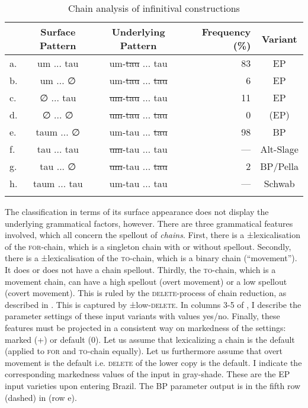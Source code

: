 \documentclass[output=paper,hidelinks,draftmode]{langscibook}
\begin{document}


\begin{table}
	\begin{tabularx}{\textwidth} {l C C r c}
		\lsptoprule
      & Surface Pattern & Underlying Pattern & {Frequency} (\%) & Variant \\\midrule
a.& um ... tau & um-\sout{tau} ... tau & 83 & EP \\
b.& um ... ∅ & um-\sout{tau} ... \sout{tau} & 6 & EP \\
c.&∅ ... tau & \sout{um}-\sout{tau} ... tau & 11 & EP \\
d.&∅ ... ∅ & \sout{um}-\sout{tau} ... \sout{tau} & 0 & (EP) \\
\midrule
e.&taum ... ∅ & um-tau ... \sout{tau} & 98 & BP \\
f.& tau ... tau & \sout{um}{}-tau ... tau & {}--- & Alt-Slage \\
g.& tau ... ∅ & \sout{um}-tau ... \sout{tau} & {}2 & BP/Pella \\
h.&taum ... tau & um-tau ... tau & {}--- & Schwab \\
		\lspbottomrule
\end{tabularx}

\caption{Chain analysis of infinitival constructions}
\label{tab:postma:5}
\end{table}


The classification in terms of its surface appearance does not display the underlying grammatical factors, however. There are three grammatical features involved, which all concern the spellout of \textit{chains}. First, there is a ±lexicalisation of the \textsc{for}-chain, which is a singleton chain with or without spellout. Secondly, there is a ±lexicalisation of the \textsc{to}-chain, which is a binary chain (``movement''). It does or does not have a chain spellout. Thirdly, the \textsc{to}-chain, which is a movement chain, can have a high spellout (overt movement) or a low spellout (covert movement). This is ruled by the \textsc{delete}{}-process of chain reduction, as described in \citet{Nunes1995}. This is captured by ±low-\textsc{delete}. In columns 3-5 of , I describe the parameter settings of these input variants with values yes/no. Finally, these features must be projected in a consistent way on markedness of the settings: marked (+) or default (0). Let us assume that lexicalizing a chain is the default (applied to \textsc{for} and \textsc{to}-chain equally). Let us furthermore assume that overt movement is the default i.e. \textsc{delete} of the lower copy is the default. I indicate the corresponding markedness values of the input in gray-shade. These are the EP input varieties upon entering Brazil. The BP parameter output is in the fifth row (dashed) in (row e).
\end{document}
